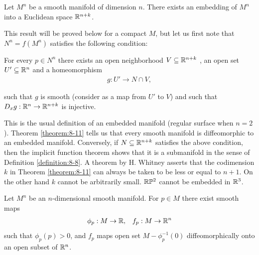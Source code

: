 \begin{theorem}\label{theorem:8-11}
  Let $M^n$ be a smooth manifold of dimension $n$. There exists an
  embedding of $M^n$ into a Euclidean space ${\mathbb{R}}^{n+k}$.
\end{theorem}

This result will be proved below for a compact $M$, but let us first note that
$N^n = f(M^n)$ satisfies the following condition:

For every $p\in N^n$ there exists an open neighborhood $V\subseteq{\ensuremath{\mathbb{R}}}^{n+k}$ , an open set
$U'\subseteq{\ensuremath{\mathbb{R}}}^n$ and a homeomorphism
\begin{align*}
  g:U'\to N\cap V,
\end{align*}

such that $g$ is smooth (consider as a map from $U'$ to $V$) and such that $D_xg:{\mathbb{R}}^n\to{\ensuremath{\mathbb{R}}}^{n+k}$ is
injective.

This is the usual definition of an embedded manifold (regular surface when $n = 2$).
Theorem \ref{theorem:8-11} tells us that every smooth manifold is diffeomorphic to an embedded
manifold. Conversely, if $N\subseteq{\ensuremath{\mathbb{R}}}^{n+k}$ satisfies the above condition, then the implicit
function theorem shows that it is a submanifold in the sense of Definition \ref{definition:8-8}.
A theorem by H. Whitney asserts that the codimension $k$ in Theorem \ref{theorem:8-11} can
always be taken to be less or equal to $n + 1$. On the other hand $k$ cannot be
arbitrarily small. ${\mathbb{R}}\mathbb{P}^2$ cannot be embedded in ${\mathbb{R}}^3$.


\begin{lemma}\label{lemma:8-12}
  Let $M^n$ be an $n$-dimensional smooth manifold. For $p\in M$ there exist smooth maps
  \begin{align*}
    \phi_p:M\to {\ensuremath{\mathbb{R}}}, && f_p:M\to {\ensuremath{\mathbb{R}}}^n
  \end{align*}
  such that $\phi_p(p)>0$, and $f_p$ maps open set $M-\phi_p^{-1}(0)$ diffeomorphically onto 
  an open subset  of ${\mathbb{R}}^n$.
\end{lemma}

